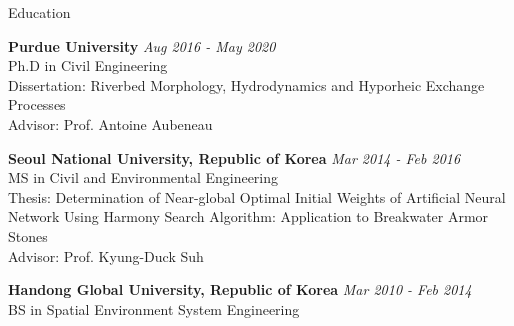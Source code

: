 \documentclass{resume_anzy} %
\begin{document}
\begin{rSection}{Education}

{\bf Purdue University} \hfill {\em Aug 2016 - May 2020} \\ 
Ph.D in Civil Engineering  \\
Dissertation: Riverbed Morphology, Hydrodynamics and Hyporheic Exchange Processes \\
Advisor: Prof. Antoine Aubeneau

{\bf Seoul National University, Republic of Korea} \hfill {\em Mar 2014 - Feb 2016} \\ 
MS in Civil and Environmental Engineering   \\
Thesis: Determination of Near-global Optimal Initial Weights of Artificial Neural Network Using Harmony Search Algorithm: Application to Breakwater Armor Stones \\
Advisor: Prof. Kyung-Duck Suh 

{\bf Handong Global University, Republic of Korea } \hfill {\em Mar 2010 - Feb 2014} \\ 
BS in Spatial Environment System Engineering  
\vspace{2mm}
\end{rSection}

\end{document}
